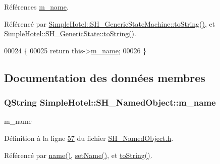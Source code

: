 Références \hyperlink{classSimpleHotel_1_1SH__NamedObject_ae4aeff788572816eabe65bd43473ce00}{m\-\_\-name}.



Référencé par \hyperlink{classSimpleHotel_1_1SH__GenericStateMachine_ad6dd1d0986c40684410ed94f1f610b12}{Simple\-Hotel\-::\-S\-H\-\_\-\-Generic\-State\-Machine\-::to\-String()}, et \hyperlink{classSimpleHotel_1_1SH__GenericState_adaded78178f9999a9e07a32871af5e61}{Simple\-Hotel\-::\-S\-H\-\_\-\-Generic\-State\-::to\-String()}.


\begin{DoxyCode}
00024 \{
00025     \textcolor{keywordflow}{return} this->\hyperlink{classSimpleHotel_1_1SH__NamedObject_ae4aeff788572816eabe65bd43473ce00}{m\_name};
00026 \}
\end{DoxyCode}


\subsection{Documentation des données membres}
\hypertarget{classSimpleHotel_1_1SH__NamedObject_ae4aeff788572816eabe65bd43473ce00}{
\subsubsection[{m\-\_\-name}]{\setlength{\rightskip}{0pt plus 5cm}Q\-String Simple\-Hotel\-::\-S\-H\-\_\-\-Named\-Object\-::m\-\_\-name\hspace{0.3cm}{\ttfamily [private]}}}\label{classSimpleHotel_1_1SH__NamedObject_ae4aeff788572816eabe65bd43473ce00}


m\-\_\-name 



Définition à la ligne \hyperlink{SH__NamedObject_8h_source_l00057}{57} du fichier \hyperlink{SH__NamedObject_8h_source}{S\-H\-\_\-\-Named\-Object.\-h}.



Référencé par \hyperlink{classSimpleHotel_1_1SH__NamedObject_ad144716345034c91cface8f3163a799e}{name()}, \hyperlink{classSimpleHotel_1_1SH__NamedObject_a1e11501093109612bb85ea24a1eba7cb}{set\-Name()}, et \hyperlink{classSimpleHotel_1_1SH__NamedObject_ab6e289aeff50c3fb0f30156c68b1e808}{to\-String()}.

